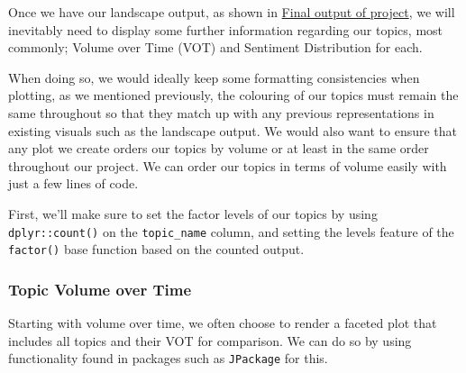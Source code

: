 \documentclass[
  letterpaper,
  DIV=11,
  numbers=noendperiod]{scrreprt}
\newenvironment{Shaded}{\begin{snugshade}}{\end{snugshade}}
\newcommand{\AttributeTok}[1]{\textcolor[rgb]{0.40,0.45,0.13}{#1}}
\newcommand{\CommentTok}[1]{\textcolor[rgb]{0.37,0.37,0.37}{#1}}
\newcommand{\ConstantTok}[1]{\textcolor[rgb]{0.56,0.35,0.01}{#1}}
\newcommand{\FunctionTok}[1]{\textcolor[rgb]{0.28,0.35,0.67}{#1}}
\newcommand{\NormalTok}[1]{\textcolor[rgb]{0.00,0.23,0.31}{#1}}
\newcommand{\OtherTok}[1]{\textcolor[rgb]{0.00,0.23,0.31}{#1}}
\newcommand{\SpecialCharTok}[1]{\textcolor[rgb]{0.37,0.37,0.37}{#1}}
\begin{document}
Once we have our landscape output, as shown in
\href{http://localhost:6377/conversation_landscape.html\#final-output-of-project}{Final
output of project}, we will inevitably need to display some further
information regarding our topics, most commonly; Volume over Time (VOT)
and Sentiment Distribution for each.

When doing so, we would ideally keep some formatting consistencies when
plotting, as we mentioned previously, the colouring of our topics must
remain the same throughout so that they match up with any previous
representations in existing visuals such as the landscape output. We
would also want to ensure that any plot we create orders our topics by
volume or at least in the same order throughout our project. We can
order our topics in terms of volume easily with just a few lines of
code.

First, we'll make sure to set the factor levels of our topics by using
\texttt{dplyr::count()} on the \texttt{topic\_name} column, and setting
the levels feature of the \texttt{factor()} base function based on the
counted output.

\begin{Shaded}
\end{Shaded}

\subsubsection{Topic Volume over Time}\label{topic-volume-over-time}

Starting with volume over time, we often choose to render a faceted plot
that includes all topics and their VOT for comparison. We can do so by
using functionality found in packages such as \texttt{JPackage} for
this.
\end{document}
